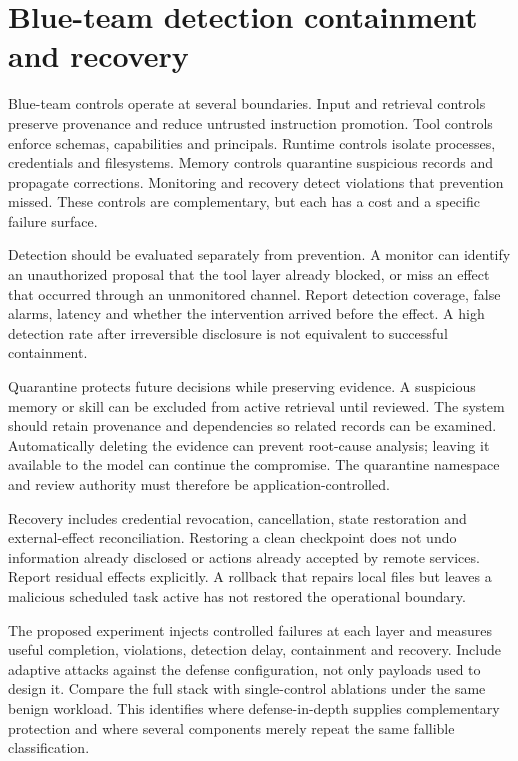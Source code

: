 \section{Blue-team detection containment and recovery}\label{sec:C28:blueteam}
Blue-team controls operate at several boundaries. Input and retrieval controls preserve provenance and reduce untrusted instruction promotion. Tool controls enforce schemas, capabilities and principals. Runtime controls isolate processes, credentials and filesystems. Memory controls quarantine suspicious records and propagate corrections. Monitoring and recovery detect violations that prevention missed. These controls are complementary, but each has a cost and a specific failure surface.

Detection should be evaluated separately from prevention. A monitor can identify an unauthorized proposal that the tool layer already blocked, or miss an effect that occurred through an unmonitored channel. Report detection coverage, false alarms, latency and whether the intervention arrived before the effect. A high detection rate after irreversible disclosure is not equivalent to successful containment.

Quarantine protects future decisions while preserving evidence. A suspicious memory or skill can be excluded from active retrieval until reviewed. The system should retain provenance and dependencies so related records can be examined. Automatically deleting the evidence can prevent root-cause analysis; leaving it available to the model can continue the compromise. The quarantine namespace and review authority must therefore be application-controlled.

Recovery includes credential revocation, cancellation, state restoration and external-effect reconciliation. Restoring a clean checkpoint does not undo information already disclosed or actions already accepted by remote services. Report residual effects explicitly. A rollback that repairs local files but leaves a malicious scheduled task active has not restored the operational boundary.

The proposed experiment injects controlled failures at each layer and measures useful completion, violations, detection delay, containment and recovery. Include adaptive attacks against the defense configuration, not only payloads used to design it. Compare the full stack with single-control ablations under the same benign workload. This identifies where defense-in-depth supplies complementary protection and where several components merely repeat the same fallible classification.


